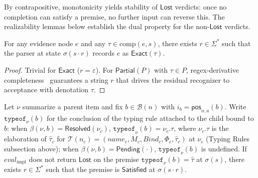 \begin{remark}
	\label{rem:lost-monotonicity}
	By contrapositive, monotonicity yields stability of $\mathsf{Lost}$
	verdicts: once no completion can satisfy a premise, no further input can
	reverse this. The realizability lemmas below establish the dual property
	for the non-$\mathsf{Lost}$ verdicts.
\end{remark}

\begin{lemma}
	\label{lem:evidence-realizable}
	For any evidence node $e$ and any $\tau \in \mathrm{comp}(e, s)$, there exists
	$r \in \Sigma^\ast$ such that the parser at state $\sigma(s\cdot r)$ records
	$e$ as $\mathsf{Exact}(\tau)$.
\end{lemma}

\begin{proof}
	Trivial for $\mathsf{Exact}$ ($r = \varepsilon$). For $\mathsf{Partial}(P)$
	with $\tau \in P$, regex-derivative completeness~\cite{owens2009regex}
	guarantees a string $r$ that drives the residual recognizer to acceptance
	with denotation $\tau$.
\end{proof}

\begin{lemma}
	\label{lem:typeof-realizable}
	Let $\nu$ summarize a parent item and fix $b \in \mathcal B(n)$ with $i_b = \mathsf{pos}_{n,a}(b)$. Write $\mathtt{typeof}_\nu(b)$ for the conclusion of the typing rule attached to the child bound to $b$: when $\beta(\nu,b) = \mathsf{Resolved}(\nu_c)$, $\mathtt{typeof}_\nu(b) = \nu_c.\tau$, where $\nu_c.\tau$ is the elaboration of $\hat\tau_{c}$ for $\mathcal T(n_c) = (\mathit{name}_c, M_c, \mathit{Bind}_c, \Phi_c, \hat\tau_{c})$ at $\nu_c$ (Typing Rules subsection above); when $\beta(\nu,b) = \mathsf{Pending}(\cdot)$, $\mathtt{typeof}_\nu(b)$ is undefined. If $\mathit{eval}_{\mathrm{impl}}$ does not return $\mathsf{Lost}$ on the premise $\mathtt{typeof}_\nu(b) = \hat\tau$ at $\sigma(s)$, there exists $r \in \Sigma^\ast$ such that the premise is $\mathsf{Satisfied}$ at $\sigma(s\cdot r)$.
\end{lemma}



